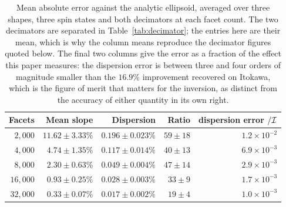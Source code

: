 \begin{table}[htbp]
\centering
\small
\caption{Mean absolute error against the analytic ellipsoid, averaged over
three shapes, three spin states and both decimators at each facet count. The
two decimators are separated in Table~\ref{tab:decimator}; the entries here
are their mean, which is why the column means reproduce the decimator
figures quoted below. The final two columns give the error as a fraction of
the effect this paper measures: the dispersion error is between three and
four orders of magnitude smaller than the $16.9\%$ improvement recovered on
Itokawa, which is the figure of merit that matters for the inversion, as
distinct from the accuracy of either quantity in its own right.}
\label{tab:ellipsoid}
\setlength{\tabcolsep}{10pt}
\begin{tabular}{rrrrr}
\toprule
Facets & Mean slope & Dispersion & Ratio
 & dispersion error $/\mathcal{I}$ \\
\midrule
$2{,}000$  & $11.62\pm3.33\%$ & $0.196\pm0.023\%$ & $59\pm18$ & $1.2\times10^{-2}$ \\
$4{,}000$  & $4.74\pm1.35\%$  & $0.117\pm0.014\%$ & $40\pm13$ & $6.9\times10^{-3}$ \\
$8{,}000$  & $2.30\pm0.63\%$  & $0.049\pm0.004\%$ & $47\pm14$ & $2.9\times10^{-3}$ \\
$16{,}000$ & $0.93\pm0.25\%$  & $0.028\pm0.003\%$ & $33\pm9$  & $1.7\times10^{-3}$ \\
$32{,}000$ & $0.33\pm0.07\%$  & $0.017\pm0.002\%$ & $19\pm4$  & $1.0\times10^{-3}$ \\
\bottomrule
\end{tabular}
\end{table}

